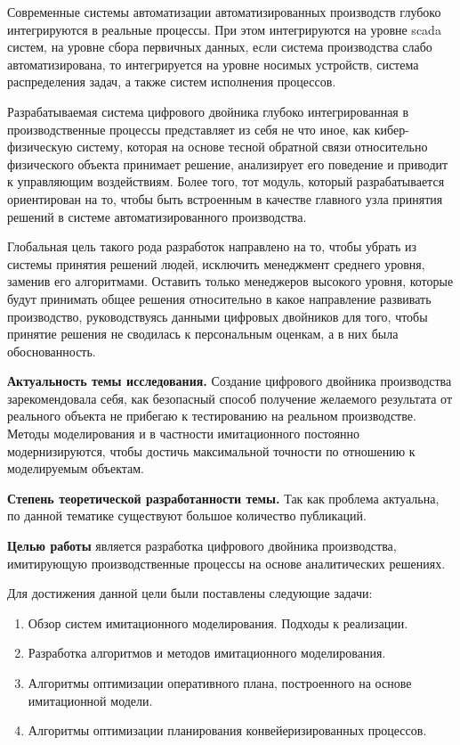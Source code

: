 
Современные системы  автоматизации автоматизированных производств глубоко интегрируются в реальные процессы.
При этом интегрируются на уровне scada систем, на уровне сбора первичных данных, если система производства слабо автоматизирована, то интегрируется на уровне носимых устройств, система распределения задач, а также систем исполнения процессов. 

Разрабатываемая система цифрового двойника глубоко интегрированная в производственные процессы представляет из себя не что иное, как кибер-физическую систему, которая на основе тесной обратной связи относительно физического объекта принимает решение, анализирует его поведение и приводит к управляющим воздействиям.
Более того, тот модуль, который разрабатывается ориентирован на то, чтобы быть встроенным в качестве главного узла принятия решений в системе автоматизированного производства.

Глобальная цель такого рода разработок направлено на то, чтобы убрать из системы принятия решений людей, исключить менеджмент среднего уровня, заменив его алгоритмами. Оставить только менеджеров высокого уровня, которые будут принимать общее решения относительно в какое направление развивать производство, руководствуясь данными цифровых двойников для того, чтобы принятие решения не сводилась к персональным оценкам, а в них была обоснованность.


\textbf{Актуальность темы исследования.} Создание цифрового двойника производства зарекомендовала себя, как безопасный способ получение желаемого результата от реального объекта не прибегаю к тестированию на реальном производстве. Методы моделирования и в частности имитационного постоянно модернизируются, чтобы достичь максимальной точности по отношению к моделируемым объектам.

\textbf{Степень теоретической разработанности темы.} Так как проблема актуальна, по данной тематике существуют большое количество публикаций.

\textbf{Целью работы} является разработка цифрового двойника производства, имитирующую производственные процессы на основе аналитических решениях.

Для достижения данной цели были поставлены следующие задачи:

\begin{enumerate}
    \item Обзор систем имитационного моделирования. Подходы к реализации.
    \item Разработка алгоритмов и методов имитационного моделирования.
    \item Алгоритмы оптимизации оперативного плана, построенного на основе имитационной модели.
    \item Алгоритмы оптимизации планирования конвейеризированных процессов.
\end{enumerate}






